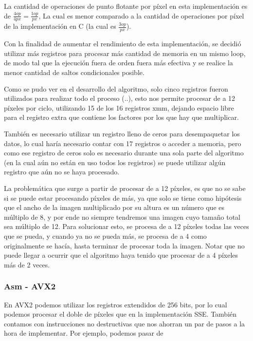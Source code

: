 La cantidad de operaciones de punto flotante por píxel en esta implementación es de $\frac{4op}{4px} = \frac{1op}{px}$, La cual es menor comparado a la cantidad de operaciones por píxel de la implementación en C (la cual es $\frac{3op}{px}$).

\vspace{2mm}

Con la finalidad de aumentar el rendimiento de esta implementación, se decidió utilizar más registros para procesar más cantidad de memoria en un mismo loop, de modo tal que la ejecución fuera de orden fuera más efectiva y se realice la menor cantidad de saltos condicionales posible.

Como se pudo ver en el desarrollo del algoritmo, solo cinco registros fueron utilizados para realizar todo el proceso (..), esto nos permite procesar de a 12 píxeles por ciclo, utilizando 15 de los 16 registros xmm, dejando espacio libre para el registro extra que contiene los factores por los que hay que multiplicar.

También es necesario utilizar un registro lleno de ceros para desempaquetar los datos, lo cual haría necesario contar con 17 registros o acceder a memoria, pero como ese registro de ceros solo es necesario durante una sola parte del algoritmo (en la cual aún no están en uso todos los registros) se puede utilizar algún registro que aún no se haya procesado.

La problemática que surge a partir de procesar de a 12 píxeles, es que no se sabe si se puede estar procesando píxeles de más, ya que solo se tiene como hipótesis que el ancho de la imagen multiplicado por su altura es un número que es múltiplo de 8, y por ende no siempre tendremos una imagen cuyo tamaño total sea múltiplo de 12. Para solucionar esto, se procesa de a 12 píxeles todas las veces que se pueda, y cuando ya no se pueda más, se procesa de a 4 como originalmente se hacía, hasta terminar de procesar toda la imagen. Notar que no puede llegar a ocurrir que el algoritmo haya tenido que procesar de a 4 píxeles más de 2 veces.

\subsubsection{Asm - AVX2}

En AVX2 podemos utilizar los registros extendidos \ymm{} de 256 bits, por lo cual podemos procesar el doble de píxeles que en la implementación SSE. También contamos con instrucciones no destructivas que nos ahorran un par de pasos a la hora de implementar. Por ejemplo, podemos pasar de

